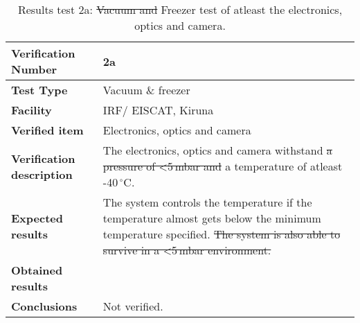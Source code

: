 \begin{table}[H]
\centering

\begin{tabular}{|m{}| m{} |}
\hline
\textbf{Verification Number} 		& 2a 							 \\ \hline
\textbf{Test Type} 					& Vacuum \& freezer				 \\ \hline
\textbf{Facility} 					& IRF/ EISCAT, Kiruna 			 \\ \hline
\textbf{Verified item} 				& Electronics, optics and camera \\ \hline

\textbf{Verification description} 	& The electronics, optics and camera withstand \st{a pressure of <5\,mbar and} a temperature of atleast -40\,$^\circ$C. \\ \hline

\textbf{Expected results} 			& The system controls the temperature if the temperature almost gets below the minimum temperature specified. \st{The system is also able to survive in a <5\,mbar environment.}\\ \hline

\textbf{Obtained results} 			& \\ \hline

\textbf{Conclusions} 				& Not verified.		\\ \hline
\end{tabular}
\caption{Results test 2a: \st{Vacuum and} Freezer test of atleast the electronics, optics and camera.}
\label{tab:testresult2:thermal}
\end{table}


\raggedbottom